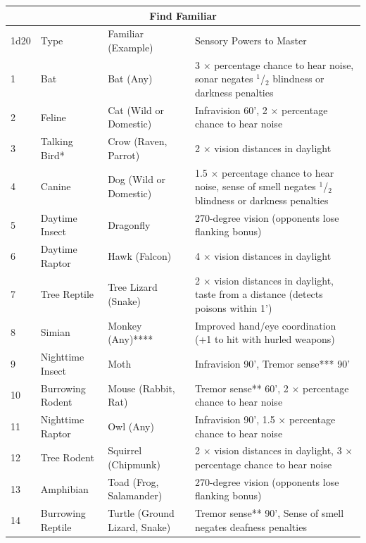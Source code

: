 \noindent\begin{minipage}{\textwidth}
\noindent
\begin{tabular}{|p{}|p{}|p{}|p{}|}
\multicolumn{4}{c}{Find Familiar} \\
\hline
1d20	& Type	& Familiar (Example)	& Sensory Powers to Master \\
\hline\hline
\rowcolor[gray]{.9}1	& Bat	& Bat (Any)	& 3 $\times$ percentage chance to hear noise, sonar negates $^1$/$_2$ blindness or darkness penalties \\
2	& Feline	& Cat (Wild or Domestic)	& Infravision 60', 2 $\times$ percentage chance to hear noise \\
\rowcolor[gray]{.9}3	& Talking Bird*	& Crow (Raven, Parrot)	& 2 $\times$ vision distances in daylight \\
4	& Canine	& Dog (Wild or Domestic)	& 1.5 $\times$ percentage chance to hear noise, sense of smell negates $^1$/$_2$ blindness or darkness penalties \\
\rowcolor[gray]{.9}5	& Daytime Insect	& Dragonfly 	& 270-degree vision (opponents lose flanking bonus) \\
6	& Daytime Raptor	& Hawk (Falcon)	& 4 $\times$ vision distances in daylight \\
\rowcolor[gray]{.9}7	& Tree Reptile	& Tree Lizard (Snake)	& 2 $\times$ vision distances in daylight, taste from a distance (detects poisons within 1') \\
8	& Simian	& Monkey (Any)****	& Improved hand/eye coordination (+1 to hit with hurled weapons) \\
\rowcolor[gray]{.9}9	& Nighttime Insect	& Moth 	& Infravision 90', Tremor sense*** 90' \\
10	& Burrowing Rodent	& Mouse (Rabbit, Rat)	& Tremor sense** 60', 2 $\times$ percentage chance to hear noise \\
\rowcolor[gray]{.9}11	& Nighttime Raptor	& Owl (Any)	& Infravision 90', 1.5 $\times$ percentage chance to hear noise \\
12	& Tree Rodent	& Squirrel (Chipmunk)	& 2 $\times$ vision distances in daylight, 3 $\times$ percentage chance to hear noise \\
\rowcolor[gray]{.9}13	& Amphibian	& Toad (Frog, Salamander)	& 270-degree vision (opponents lose flanking bonus) \\
14	& Burrowing Reptile	& Turtle (Ground Lizard, Snake)	& Tremor sense** 90', Sense of smell negates deafness penalties \\

\end{tabular}
\end{minipage}
